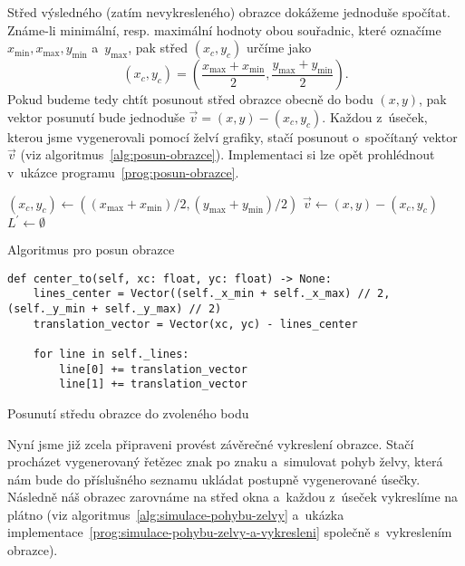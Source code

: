 Střed výsledného (zatím nevykresleného) obrazce dokážeme jednoduše spočítat. Známe-li minimální, resp. maximální hodnoty obou souřadnic, které označíme $x_{\text{min}},x_{\text{max}},y_{\text{min}}$ a~$y_{\text{max}}$, pak střed $(x_c,y_c)$ určíme jako
\[(x_c,y_c)=\left(\dfrac{x_{\text{max}}+x_{\text{min}}}{2},\dfrac{y_{\text{max}}+y_{\text{min}}}{2}\right).\]
Pokud budeme tedy chtít posunout střed obrazce obecně do bodu $(x,y)$, pak vektor posunutí bude jednoduše $\vec{v}=(x,y)-(x_c,y_c)$. Každou z~úseček, kterou jsme vygenerovali pomocí želví grafiky, stačí posunout o~spočítaný vektor $\vec{v}$ (viz algoritmus~\ref{alg:posun-obrazce}). Implementaci si lze opět prohlédnout v~ukázce programu~\ref{prog:posun-obrazce}.
\begin{algorithm}[h]
    $(x_c,y_c)\gets((x_{\text{max}}+x_{\text{min}})/2,(y_{\text{max}}+y_{\text{min}})/2)$\;
    $\vec{v}\gets(x,y)-(x_c,y_c)$\;
    $L^\prime\gets\emptyset$\;
    \;
    \caption{Algoritmus pro posun obrazce}
    \label{alg:posun-obrazce}
\end{algorithm}
\begin{program}[h]
\begin{lstlisting}[style=python]
def center_to(self, xc: float, yc: float) -> None:
    lines_center = Vector((self._x_min + self._x_max) // 2, (self._y_min + self._y_max) // 2)
    translation_vector = Vector(xc, yc) - lines_center

    for line in self._lines:
        line[0] += translation_vector
        line[1] += translation_vector
\end{lstlisting}
    \caption{Posunutí středu obrazce do zvoleného bodu}
    \label{prog:posun-obrazce}
\end{program}
Nyní jsme již zcela připraveni provést závěrečné vykreslení obrazce. Stačí procházet vygenerovaný řetězec znak po znaku a~simulovat pohyb želvy, která nám bude do příslušného seznamu ukládat postupně vygenerované úsečky. Následně náš obrazec zarovnáme na střed okna a~každou z~úseček vykreslíme na plátno (viz algoritmus~\ref{alg:simulace-pohybu-zelvy} a~ukázka implementace~\ref{prog:simulace-pohybu-zelvy-a-vykresleni} společně s~vykreslením obrazce).
